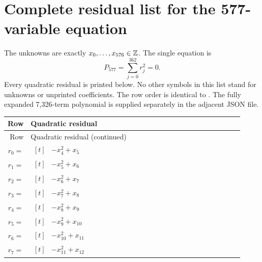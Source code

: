 \section{Complete residual list for the 577-variable equation}\label{app:rows}
The unknowns are exactly \(x_0,\ldots,x_{576}\in\mathbb Z\). The single equation is
\[
P_{577}=\sum_{j=0}^{362}r_j^2=0.
\]
Every quadratic residual is printed below. No other symbols in this list
stand for unknowns or unprinted coefficients. The row order is identical to
. The fully expanded 7,326-term
polynomial is supplied separately in the adjacent JSON file.

\begingroup
\fontsize{8.5}{10.5}\selectfont
\setlength{\tabcolsep}{3pt}
\renewcommand{\arraystretch}{1.13}
\begin{longtable}{@{}r p{0.92\linewidth}@{}}
\toprule
Row & Quadratic residual\\
\midrule
\endfirsthead
\toprule
Row & Quadratic residual (continued)\\
\midrule
\endhead
\bottomrule
\endfoot
$r_{0}=$ & $\begin{aligned}[t]&-x_{4}^{2}+x_{5}\end{aligned}$ \\[2pt]
$r_{1}=$ & $\begin{aligned}[t]&-x_{5}^{2}+x_{6}\end{aligned}$ \\[2pt]
$r_{2}=$ & $\begin{aligned}[t]&-x_{6}^{2}+x_{7}\end{aligned}$ \\[2pt]
$r_{3}=$ & $\begin{aligned}[t]&-x_{7}^{2}+x_{8}\end{aligned}$ \\[2pt]
$r_{4}=$ & $\begin{aligned}[t]&-x_{8}^{2}+x_{9}\end{aligned}$ \\[2pt]
$r_{5}=$ & $\begin{aligned}[t]&-x_{9}^{2}+x_{10}\end{aligned}$ \\[2pt]
$r_{6}=$ & $\begin{aligned}[t]&-x_{10}^{2}+x_{11}\end{aligned}$ \\[2pt]
$r_{7}=$ & $\begin{aligned}[t]&-x_{11}^{2}+x_{12}\end{aligned}$ \\[2pt]

\end{longtable}
